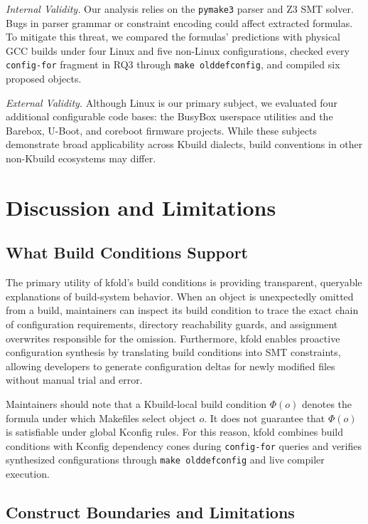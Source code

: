 \documentclass[acmsmall]{acmart}
\newcommand{\tool}{\textsf{kfold}\xspace}
\begin{document}
\emph{Internal Validity.}
Our analysis relies on the \texttt{pymake3} parser and Z3 SMT solver.
Bugs in parser grammar or constraint encoding could affect extracted formulas.
To mitigate this threat, we compared the formulas' predictions with physical GCC builds under four Linux and five non-Linux configurations, checked every \texttt{config-for} fragment in RQ3 through \texttt{make olddefconfig}, and compiled six proposed objects.

\emph{External Validity.}
Although Linux is our primary subject, we evaluated four additional configurable code bases: the BusyBox userspace utilities and the Barebox, U-Boot, and coreboot firmware projects.
While these subjects demonstrate broad applicability across Kbuild dialects, build conventions in other non-Kbuild ecosystems may differ.

\section{Discussion and Limitations}\label{sec:discussion}

\subsection{What Build Conditions Support}\label{sec:discussion:support}

The primary utility of \tool's build conditions is providing transparent, queryable explanations of build-system behavior.
When an object is unexpectedly omitted from a build, maintainers can inspect its build condition to trace the exact chain of configuration requirements, directory reachability guards, and assignment overwrites responsible for the omission.
Furthermore, \tool enables proactive configuration synthesis by translating build conditions into SMT constraints, allowing developers to generate configuration deltas for newly modified files without manual trial and error.

Maintainers should note that a Kbuild-local build condition $\Phi(o)$ denotes the formula under which Makefiles select object $o$.
It does not guarantee that $\Phi(o)$ is satisfiable under global Kconfig rules.
For this reason, \tool combines build conditions with Kconfig dependency cones during \texttt{config-for} queries and verifies synthesized configurations through \texttt{make olddefconfig} and live compiler execution.

\subsection{Construct Boundaries and Limitations}\label{sec:discussion:limitations}
\end{document}
